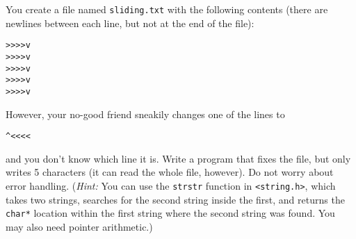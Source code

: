 You create a file named \texttt{sliding.txt} with the following contents (there are newlines between each line, but not at the end of the file):

\begin{verbatim}
>>>>v
>>>>v
>>>>v
>>>>v
>>>>v
\end{verbatim}

However, your no-good friend sneakily changes one of the lines to \begin{verbatim}^<<<<\end{verbatim}
and you don't know which line it is.
Write a program that fixes the file, but only writes 5 characters (it can read the whole file, however).
Do not worry about error handling.
(\textit{Hint:} You can use the \texttt{strstr} function in \texttt{<string.h>},
which takes two strings, searches for the second string inside the first, and returns the \texttt{char*} location within the first string where the second string was found.
You may also need pointer arithmetic.)

\begin{answer}

\end{answer}
